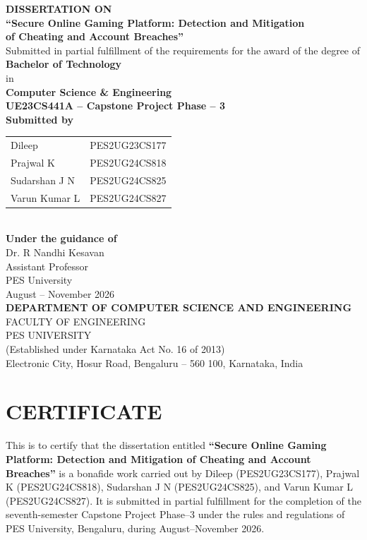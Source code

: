 \documentclass[12pt,a4paper,oneside]{report}
\begin{document}
\begin{titlepage}
\centering
\vspace*{8mm}
{\Large \textbf{DISSERTATION ON}}\\[6mm]
{\Large \textbf{“Secure Online Gaming Platform: Detection and Mitigation}\\
\textbf{of Cheating and Account Breaches”}}\\[10mm]
{\large Submitted in partial fulfillment of the requirements for the award of the degree of}\\[3mm]
{\large \textbf{Bachelor of Technology}}\\
{\large in}\\
{\large \textbf{Computer Science \& Engineering}}\\[10mm]
{\large \textbf{UE23CS441A -- Capstone Project Phase -- 3}}\\[8mm]
{\large \textbf{Submitted by}}\\[3mm]
\begin{tabular}{ll}
Dileep & PES2UG23CS177\\
Prajwal K & PES2UG24CS818\\
Sudarshan J N & PES2UG24CS825\\
Varun Kumar L & PES2UG24CS827
\end{tabular}\\[10mm]
{\large \textbf{Under the guidance of}}\\[3mm]
{\large Dr. R Nandhi Kesavan}\\
{\large Assistant Professor}\\
{\large PES University}\\[10mm]
{\large August -- November 2026}\\[8mm]
{\large \textbf{DEPARTMENT OF COMPUTER SCIENCE AND ENGINEERING}}\\
{\large FACULTY OF ENGINEERING}\\
{\large PES UNIVERSITY}\\
{\small (Established under Karnataka Act No. 16 of 2013)}\\
{\small Electronic City, Hosur Road, Bengaluru -- 560 100, Karnataka, India}
\vfill
\end{titlepage}

\chapter*{CERTIFICATE}
This is to certify that the dissertation entitled \textbf{“Secure Online Gaming Platform: Detection and Mitigation of Cheating and Account Breaches”} is a bonafide work carried out by Dileep (PES2UG23CS177), Prajwal K (PES2UG24CS818), Sudarshan J N (PES2UG24CS825), and Varun Kumar L (PES2UG24CS827). It is submitted in partial fulfillment for the completion of the seventh-semester Capstone Project Phase--3 under the rules and regulations of PES University, Bengaluru, during August--November 2026.
\end{document}
